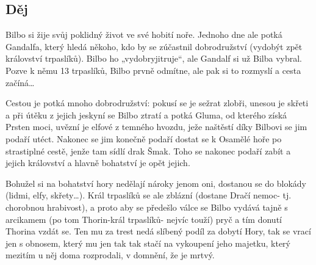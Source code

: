 \subsection*{Děj}
Bilbo si žije svůj poklidný život ve své hobití noře.
Jednoho dne ale potká Gandalfa, který hledá někoho, kdo by se zúčastnil dobrodružství (vydobýt zpět království trpaslíků).
Bilbo ho „vydobryjitruje“, ale Gandalf si už Bilba vybral.
Pozve k němu 13 trpaslíků, Bilbo prvně odmítne, ale pak si to rozmyslí a cesta začíná…

Cestou je potká mnoho dobrodružství: pokusí se je sežrat zlobři, unesou je skřeti a při útěku z jejich jeskyní se Bilbo ztratí a potká Gluma, od kterého získá Prsten moci, uvězní je elfové z temného hvozdu, ježe naštěstí díky Bilbovi se jim podaří utéct.
Nakonec se jim konečně podaří dostat se k Osamělé hoře po strastiplné cestě, jenže tam sídlí drak Šmak.
Toho se nakonec podaří zabít a jejich království a hlavně bohatství je opět jejich.

Bohužel si na bohatství hory nedělají nároky jenom oni, dostanou se do blokády (lidmi, elfy, skřety…).
Král trpaslíků se ale zblázní (dostane Dračí nemoc- tj. chorobnou hrabivost), a proto aby se předešlo válce se Bilbo vydává tajně s arcikamem (po tom Thorin-král trpaslíků- nejvíc touží) pryč a tím donutí Thorina vzdát se.
Ten mu za trest nedá slíbený podíl za dobytí Hory, tak se vrací jen s obnosem, který mu jen tak tak stačí na vykoupení jeho majetku, který mezitím u něj doma rozprodali, v domnění, že je mrtvý.
